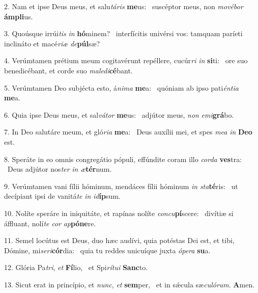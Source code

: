2. Nam et ipse Deus meus, et salu\textit{tá}\textit{ris} \textbf{me}us: \ast\  suscéptor meus, non \textit{mo}\textit{vé}\textit{bor} \textbf{ám}\textbf{pli}us.\

3. Quoúsque irrúi\textit{tis} \textit{in} \textbf{hó}minem? \ast\  interfícitis univérsi vos: tamquam paríeti inclináto et macé\textit{ri}\textit{æ} \textit{de}\textbf{púl}sæ?\

4. Verúmtamen prétium meum cogitavérunt repéllere, cucúr\textit{ri} \textit{in} \textbf{si}ti: \ast\  ore suo benedicébant, et corde suo \textit{ma}\textit{le}\textit{di}\textbf{cé}bant.\

5. Verúmtamen Deo subjécta esto, á\textit{ni}\textit{ma} \textbf{me}a: \ast\  quóniam ab ipso pati\textit{én}\textit{ti}\textit{a} \textbf{me}a.\

6. Quia ipse Deus meus, et sal\textit{vá}\textit{tor} \textbf{me}us: \ast\  adjútor meus, \textit{non} \textit{e}\textit{mi}\textbf{grá}bo.\

7. In Deo salutáre meum, et gló\textit{ri}\textit{a} \textbf{me}a: \ast\  Deus auxílii mei, et spes \textit{me}\textit{a} \textit{in} \textbf{De}\textbf{o} est.\

8. Speráte in eo omnis congregátio pópuli, effúndite coram illo \textit{cor}\textit{da} \textbf{ves}tra: \ast\  Deus adjútor nos\textit{ter} \textit{in} \textit{æ}\textbf{tér}num.\

9. Verúmtamen vani fílii hóminum, mendáces fílii hóminum \textit{in} \textit{sta}\textbf{té}ris: \ast\  ut decípiant ipsi de vanitá\textit{te} \textit{in} \textit{id}\textbf{íp}sum.\

10. Nolíte speráre in iniquitáte, et rapínas nolíte \textit{con}\textit{cu}\textbf{pí}scere: \ast\  divítiæ si áffluant, nolí\textit{te} \textit{cor} \textit{ap}\textbf{pó}\textbf{ne}re.\

11. Semel locútus est Deus, duo hæc audívi, quia potéstas Dei est, et tibi, Dómine, mi\textit{se}\textit{ri}\textbf{cór}dia: \ast\  quia tu reddes unicuíque juxta \textit{ó}\textit{pe}\textit{ra} \textbf{su}a.\

12. Glória Pa\textit{tri}, \textit{et} \textbf{Fí}lio, \ast\  et Spi\textit{rí}\textit{tu}\textit{i} \textbf{Sanc}to.\

13. Sicut erat in princípio, et \textit{nunc}, \textit{et} \textbf{sem}per, \ast\  et in sǽcula sæ\textit{cu}\textit{ló}\textit{rum}. \textbf{A}men.\

